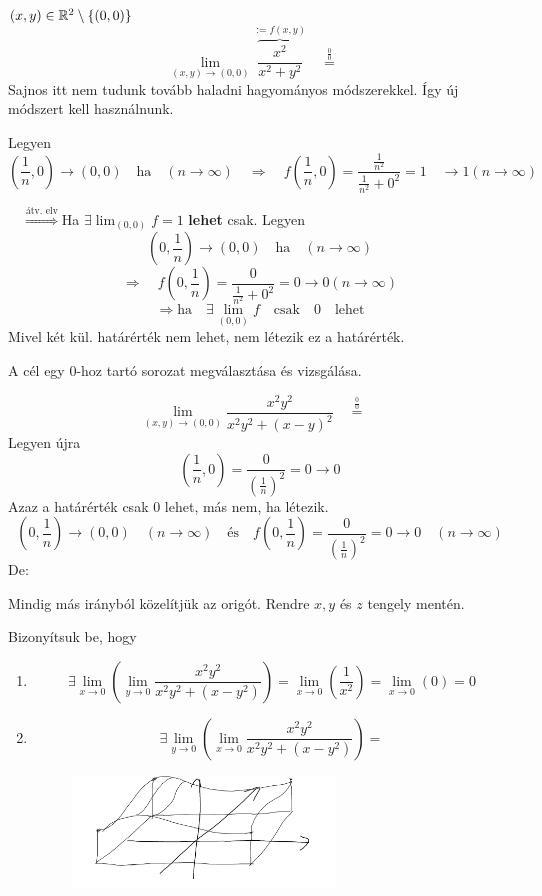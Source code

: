 \documentclass[a4paper,11.5pt]{article}
\begin{document}
	\begin{task}$(x,y)\in\mathbb{R}^2\setminus\{(0,0)\}$
		\[ \lim_{(x,y)\to(0,0)}\overbrace{\frac{x^2}{x^2+y^2}}^{:=f(x,y)}\quad \overset{\frac{0}{0}}{=}\quad  \]
		Sajnos itt nem tudunk tovább haladni hagyományos módszerekkel. Így új módszert kell használnunk.
		\smallskip
		
		Legyen \[\left(\frac{1}{n},0\right)\to(0,0)\quad \text{ha}\quad (n\to\infty)\quad \Rightarrow\quad f\left(\frac{1}{n},0\right)=\frac{\frac{1}{n^2}}{\frac{1}{n^2}+0^2}=1\quad \to1(n\to\infty)\]
		
		$\quad \overset{\text{átv. elv}}{\Rightarrow}$\quad Ha $\exists\lim_{(0,0)}f=1$ \textbf{lehet} csak.
		Legyen 
		\[ \left(0,\frac{1}{n}\right)\to(0,0)\quad \text{ha}\quad (n\to\infty) \]
		\[ \Rightarrow\quad f\left(0,\frac{1}{n}\right)=\frac{0}{\frac{1}{n^2}+0^2}=0\to 0(n\to\infty) \]
		\[ \Rightarrow \text{ha}\quad \exists\lim_{(0,0)}f\quad \text{csak}\quad 0 \quad \text{lehet} \]
		Mivel két kül. határérték nem lehet, nem létezik ez a határérték.
	\end{task}
	\begin{note}
		A cél egy 0-hoz tartó sorozat megválasztása és vizsgálása.
	\end{note}
	\begin{task}
		\[ \lim_{(x,y)\to(0,0)}\frac{x^2y^2}{x^2y^2+(x-y)^2}\quad \overset{\frac{0}{0}}{=}\quad  \]
		Legyen újra
		\[ \left(\frac{1}{n},0\right)=\frac{0}{\left(\frac{1}{n}\right)^2}=0\to0 \]
		Azaz a határérték csak 0 lehet, más nem, ha létezik.
		\[ \left(0,\frac{1}{n}\right)\to(0,0)\quad (n\to\infty)\quad \text{és}\quad  f\left(0,\frac{1}{n}\right)=\frac{0}{\left(\frac{1}{n}\right)^2}=0\to 0\quad (n\to\infty) \]
		De:
	\end{task}
	\begin{note}
		Mindig más irányból közelítjük az origót. Rendre $x, y$ és $z$ tengely mentén.
	\end{note}
	\begin{task}
		Bizonyítsuk be, hogy
		\begin{enumerate}
			\item \[ \exists\lim_{x\to0}\left(\lim_{y\to0}\frac{x^2y^2}{x^2y^2+(x-y^2)}\right)=\lim_{x\to0}\left(\frac{1}{x^2}\right)=\lim_{x\to0}(0)=0 \]
			\item \[ \exists\lim_{y\to0}\left(\lim_{x\to0}\frac{x^2y^2}{x^2y^2+(x-y^2)}\right)= \]
			\begin{figure}[H]
				\centering
				\includegraphics[height=3cm]{kepek/24.png}
				\caption{}
			\end{figure}
		\end{enumerate}
	\end{task}
\end{document}
